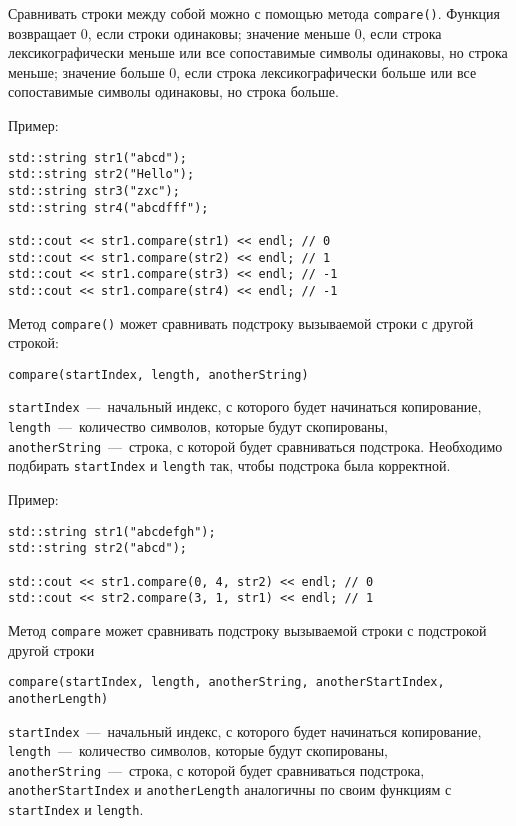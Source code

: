 Сравнивать строки между собой можно с помощью метода \lstinline|compare()|. Функция возвращает 0, если строки одинаковы; значение меньше 0, если строка лексикографически меньше или все сопоставимые символы одинаковы, но строка меньше; значение больше 0, если строка лексикографически больше или все сопоставимые символы одинаковы, но строка больше.

Пример:

\begin{lstlisting}
std::string str1("abcd");
std::string str2("Hello");
std::string str3("zxc");
std::string str4("abcdfff");

std::cout << str1.compare(str1) << endl; // 0
std::cout << str1.compare(str2) << endl; // 1
std::cout << str1.compare(str3) << endl; // -1
std::cout << str1.compare(str4) << endl; // -1
\end{lstlisting}

Метод \lstinline|compare()| может сравнивать подстроку вызываемой строки с другой строкой:
\begin{lstlisting}
compare(startIndex, length, anotherString)
\end{lstlisting}

\lstinline|startIndex|~---~начальный индекс, с которого будет начинаться копирование, \lstinline|length|~---~количество символов, которые будут скопированы, \lstinline|anotherString|~---~строка, с которой будет сравниваться подстрока. Необходимо подбирать \lstinline|startIndex| и \lstinline|length| так, чтобы подстрока была корректной.

Пример:

\begin{lstlisting}
std::string str1("abcdefgh");
std::string str2("abcd");

std::cout << str1.compare(0, 4, str2) << endl; // 0
std::cout << str2.compare(3, 1, str1) << endl; // 1
\end{lstlisting}

Метод \lstinline|compare| может сравнивать подстроку вызываемой строки с подстрокой другой строки
\begin{lstlisting}
compare(startIndex, length, anotherString, anotherStartIndex, anotherLength)
\end{lstlisting}

\lstinline|startIndex|~---~начальный индекс, с которого будет начинаться копирование, \lstinline|length|~---~количество символов, которые будут скопированы, \lstinline|anotherString|~---~строка, с которой будет сравниваться подстрока, \lstinline|anotherStartIndex| и \lstinline|anotherLength| аналогичны по своим функциям с \lstinline|startIndex| и \lstinline|length|.

